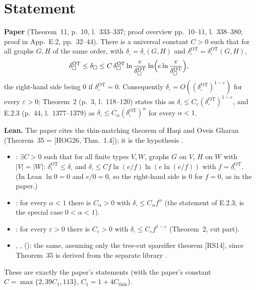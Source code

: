 

\paperversion

\section{Statement}
\textbf{Paper} (Theorem~11, p.~10, l.~333--337; proof overview pp.~10--11, l.~338--380; proof in App.~E.2, pp.~32--44).
There is a universal constant $C>0$ such that for all graphs $G,H$ of the same order, with
$\delta_\square=\delta_\square(G,H)$ and $\delta^{\mathrm{OT}}_\square=\delta^{\mathrm{OT}}_\square(G,H)$,
\[
\delta^{\mathrm{OT}}_\square\le\delta_\square\le C\,\delta^{\mathrm{OT}}_\square\ln\frac{e}{\delta^{\mathrm{OT}}_\square}
\ln\Bigl(e\ln\frac{e}{\delta^{\mathrm{OT}}_\square}\Bigr),
\]
the right-hand side being $0$ if $\delta^{\mathrm{OT}}_\square=0$. Consequently $\delta_\square=O((\delta^{\mathrm{OT}}_\square)^{1-\varepsilon})$
for every $\varepsilon>0$; Theorem~2 (p.~3, l.~118--120) states this as $\delta_\square\le C_\varepsilon(\delta^{\mathrm{OT}}_\square)^{1-\varepsilon}$,
and E.2.3 (p.~44, l.~1377--1379) as $\delta_\square\le C_\alpha(\delta^{\mathrm{OT}}_\square)^\alpha$ for every $\alpha<1$.

\textbf{Lean.} The paper cites the thin-matching theorem of Haqi and Oveis Gharan (Theorem~35 = [HOG26, Thm.~1.4]); it
is the hypothesis .
\begin{itemize}
\item {}: $\exists C>0$ such that for all finite types $V,W$, graphs $G$ on $V$, $H$ on $W$
with $|V|=|W|$: $\delta^{\mathrm{OT}}_\square\le\delta_\square$ and $\delta_\square\le C f\ln(e/f)\ln(e\ln(e/f))$ with
$f=\delta^{\mathrm{OT}}_\square$. (In Lean $\ln 0=0$ and $e/0=0$, so the right-hand side is $0$ for $f=0$, as in the paper.)
\item {}: for every $\alpha<1$ there is $C_\alpha>0$ with
$\delta_\square\le C_\alpha f^\alpha$ (the statement of E.2.3;  is the special case $0<\alpha<1$).
\item {}: for every $\varepsilon>0$ there is $C_\varepsilon>0$ with
$\delta_\square\le C_\varepsilon f^{1-\varepsilon}$ (Theorem~2, cut part).
\item {}, , 
(): the same, assuming only the tree-cut sparsifier theorem [RS14], since Theorem~35 is
derived from the separate library .
\end{itemize}
These are exactly the paper's statements (with the paper's constant $C=\max\{2,39C_1,113\}$, $C_1=1+4C_{\mathrm{thin}}$).

